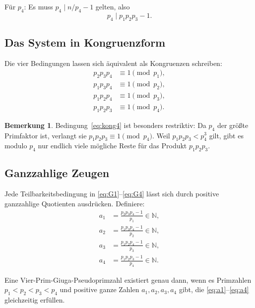 \documentclass[12pt,a4paper]{amsart}
\theoremstyle{definition}
\newtheorem{remark}[theorem]{Bemerkung}
\newcommand{\N}{\mathbb{N}}
\begin{document}
Für $p_4$: Es muss $p_4 \mid n/p_4 - 1$ gelten, also
\begin{equation}
  p_4 \mid p_1 p_2 p_3 - 1.
  \tag{G4}
  \label{eq:G4}
\end{equation}

\subsection{Das System in Kongruenzform}

Die vier Bedingungen lassen sich äquivalent als Kongruenzen schreiben:
\begin{align}
  p_2 p_3 p_4 &\equiv 1 \pmod{p_1}, \label{eq:kong1} \\
  p_1 p_3 p_4 &\equiv 1 \pmod{p_2}, \label{eq:kong2} \\
  p_1 p_2 p_4 &\equiv 1 \pmod{p_3}, \label{eq:kong3} \\
  p_1 p_2 p_3 &\equiv 1 \pmod{p_4}. \label{eq:kong4}
\end{align}

\begin{remark}
Bedingung~\eqref{eq:kong4} ist besonders restriktiv: Da $p_4$ der größte
Primfaktor ist, verlangt sie $p_1 p_2 p_3 \equiv 1 \pmod{p_4}$.  Weil
$p_1 p_2 p_3 < p_4^3$ gilt, gibt es modulo $p_4$ nur endlich viele mögliche
Reste für das Produkt $p_1 p_2 p_3$.
\end{remark}

\subsection{Ganzzahlige Zeugen}

Jede Teilbarkeitsbedingung in \eqref{eq:G1}--\eqref{eq:G4} lässt sich durch
positive ganzzahlige Quotienten ausdrücken.  Definiere:
\begin{align}
  a_1 &= \frac{p_2 p_3 p_4 - 1}{p_1} \in \N, \label{eq:a1} \\
  a_2 &= \frac{p_1 p_3 p_4 - 1}{p_2} \in \N, \label{eq:a2} \\
  a_3 &= \frac{p_1 p_2 p_4 - 1}{p_3} \in \N, \label{eq:a3} \\
  a_4 &= \frac{p_1 p_2 p_3 - 1}{p_4} \in \N. \label{eq:a4}
\end{align}

Eine Vier-Prim-Giuga-Pseudoprimzahl existiert genau dann, wenn es Primzahlen
$p_1 < p_2 < p_3 < p_4$ und positive ganze Zahlen $a_1, a_2, a_3, a_4$ gibt,
die \eqref{eq:a1}--\eqref{eq:a4} gleichzeitig erfüllen.

\end{document}
